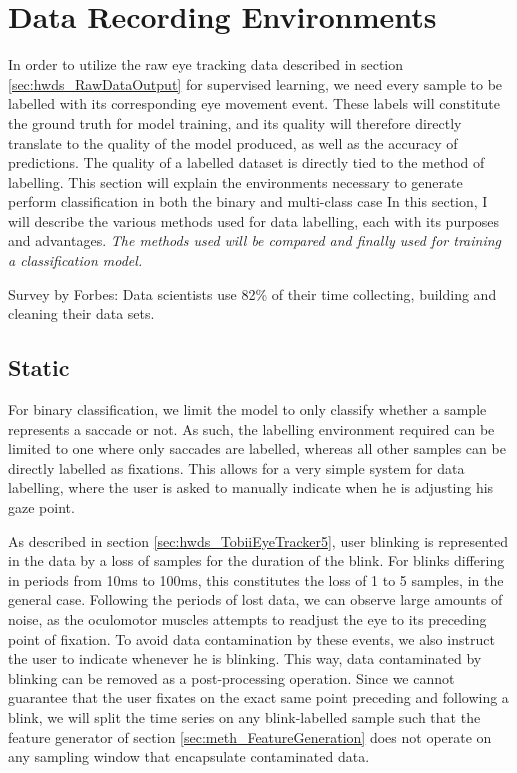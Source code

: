 \section{Data Recording Environments} \label{sec:meth_DataRecordingEnvironments}

In order to utilize the raw eye tracking data described in section \ref{sec:hwds_RawDataOutput} for supervised learning, we need every sample to be labelled with its corresponding eye movement event. These labels will constitute the ground truth for model training, and its quality will therefore directly translate to the quality of the model produced, as well as the accuracy of predictions. The quality of a labelled dataset is directly tied to the method of labelling. This section will explain the environments necessary to generate perform classification in both the binary and multi-class case
In this section, I will describe the various methods used for data labelling, each with its purposes and advantages. \textit{The methods used will be compared and finally used for training a classification model.}

Survey by Forbes: Data scientists use 82\% of their time collecting, building and cleaning their data sets. 

\subsection{Static}
For binary classification, we limit the model to only classify whether a sample represents a saccade or not. As such, the labelling environment required can be limited to one where only saccades are labelled, whereas  all other samples can be directly labelled as fixations. This allows for a very simple system for data labelling, where the user is asked to manually indicate when he is adjusting his gaze point.

As described in section \ref{sec:hwds_TobiiEyeTracker5}, user blinking is represented in the data by a loss of samples for the duration of the blink. For blinks differing in periods from 10ms to 100ms, this constitutes the loss of 1 to 5 samples, in the general case. Following the periods of lost data, we can observe large amounts of noise, as the oculomotor muscles attempts to readjust the eye to its preceding point of fixation. To avoid data contamination by these events, we also instruct the user to indicate whenever he is blinking. This way, data contaminated by blinking can be removed as a post-processing operation. Since we cannot guarantee that the user fixates on the exact same point preceding and following a blink, we will split the time series on any blink-labelled sample such that the feature generator of section \ref{sec:meth_FeatureGeneration} does not operate on any sampling window that encapsulate contaminated data. 

